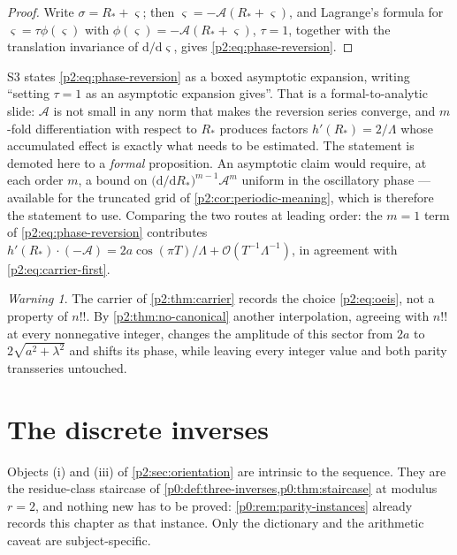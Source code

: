 \documentclass[11pt,a4paper,oneside]{book}
\theoremstyle{plain}
\theoremstyle{definition}
\theoremstyle{remark}
\newtheorem{warning}[theorem]{Warning}
\newcommand{\dd}{\mathrm{d}}
\newcommand{\bigO}{\mathcal{O}}
\begin{document}
\begin{proof}
Write \(\sigma=R_*+\varsigma\); then \(\varsigma=-\mathcal A(R_*+\varsigma)\),
and Lagrange's formula for \(\varsigma=\tau\phi(\varsigma)\) with
\(\phi(\varsigma)=-\mathcal A(R_*+\varsigma)\), \(\tau=1\), together with the
translation invariance of \(\dd/\dd\varsigma\), gives
\cref{p2:eq:phase-reversion}.
\end{proof}

\begin{repairbox}
\textsf{S3} states \cref{p2:eq:phase-reversion} as a boxed asymptotic
expansion, writing ``setting \(\tau=1\) as an asymptotic expansion gives''.
That is a formal-to-analytic slide: \(\mathcal A\) is not small in any norm
that makes the reversion series converge, and \(m\)-fold differentiation with
respect to \(R_*\) produces factors \(h'(R_*)=2/\Lambda\) whose accumulated
effect is exactly what needs to be estimated.  The statement is demoted here to
a \emph{formal} proposition.  An asymptotic claim would require, at each order
\(m\), a bound on \(\bigl(\dd/\dd R_*\bigr)^{m-1}\mathcal A^m\) uniform in the
oscillatory phase --- available for the truncated grid of
\cref{p2:cor:periodic-meaning}, which is therefore the statement to use.
Comparing the two routes at leading order: the \(m=1\) term of
\cref{p2:eq:phase-reversion} contributes
\(h'(R_*)\cdot(-\mathcal A)=2a\cos(\pi T)/\Lambda+\bigO(T^{-1}\Lambda^{-1})\),
in agreement with \cref{p2:eq:carrier-first}.
\end{repairbox}

\begin{warning}
\label{p2:rem:not-intrinsic}
The carrier of \cref{p2:thm:carrier} records the choice
\cref{p2:eq:oeis}, not a property of \(n!!\).  By
\cref{p2:thm:no-canonical} another interpolation, agreeing with \(n!!\) at
every nonnegative integer, changes the amplitude of this sector from \(2a\) to
\(2\sqrt{a^2+\lambda^2}\) and shifts its phase, while leaving every integer
value and both parity transseries untouched.
\end{warning}

\section{The discrete inverses}
\label{p2:sec:discrete}

Objects (i) and (iii) of \cref{p2:sec:orientation} are intrinsic to the
sequence.  They are the residue-class staircase of
\cref{p0:def:three-inverses,p0:thm:staircase} at modulus \(r=2\), and nothing
new has to be proved: \cref{p0:rem:parity-instances} already records this
chapter as that instance.  Only the dictionary and the arithmetic caveat are
subject-specific.
\end{document}
